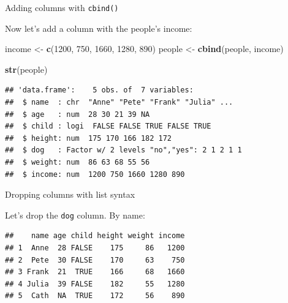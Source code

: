 \documentclass[ignorenonframetext,]{beamer}
\newenvironment{Shaded}{\begin{snugshade}}{\end{snugshade}}
\newcommand{\CommentTok}[1]{\textcolor[rgb]{0.56,0.35,0.01}{\textit{#1}}}
\newcommand{\DecValTok}[1]{\textcolor[rgb]{0.00,0.00,0.81}{#1}}
\newcommand{\KeywordTok}[1]{\textcolor[rgb]{0.13,0.29,0.53}{\textbf{#1}}}
\newcommand{\NormalTok}[1]{#1}
\newcommand{\OperatorTok}[1]{\textcolor[rgb]{0.81,0.36,0.00}{\textbf{#1}}}
\newcommand{\OtherTok}[1]{\textcolor[rgb]{0.56,0.35,0.01}{#1}}
\newcommand{\StringTok}[1]{\textcolor[rgb]{0.31,0.60,0.02}{#1}}
\begin{document}
\begin{frame}[fragile]{Adding columns with \texttt{cbind()}}
\protect\hypertarget{adding-columns-with-cbind}{}

Now let's add a column with the people's income:

\begin{Shaded}
\begin{Highlighting}[]
\NormalTok{income <-}\StringTok{ }\KeywordTok{c}\NormalTok{(}\DecValTok{1200}\NormalTok{, }\DecValTok{750}\NormalTok{, }\DecValTok{1660}\NormalTok{, }\DecValTok{1280}\NormalTok{, }\DecValTok{890}\NormalTok{) }
\NormalTok{people <-}\StringTok{ }\KeywordTok{cbind}\NormalTok{(people, income)}
 
 \KeywordTok{str}\NormalTok{(people)}
\end{Highlighting}
\end{Shaded}

\begin{verbatim}
## 'data.frame':    5 obs. of  7 variables:
##  $ name  : chr  "Anne" "Pete" "Frank" "Julia" ...
##  $ age   : num  28 30 21 39 NA
##  $ child : logi  FALSE FALSE TRUE FALSE TRUE
##  $ height: num  175 170 166 182 172
##  $ dog   : Factor w/ 2 levels "no","yes": 2 1 2 1 1
##  $ weight: num  86 63 68 55 56
##  $ income: num  1200 750 1660 1280 890
\end{verbatim}

\end{frame}

\begin{frame}[fragile]{Dropping columns with list syntax}
\protect\hypertarget{dropping-columns-with-list-syntax}{}

Let's drop the \texttt{dog} column. By name:

\begin{Shaded}
\end{Shaded}

\begin{verbatim}
##    name age child height weight income
## 1  Anne  28 FALSE    175     86   1200
## 2  Pete  30 FALSE    170     63    750
## 3 Frank  21  TRUE    166     68   1660
## 4 Julia  39 FALSE    182     55   1280
## 5  Cath  NA  TRUE    172     56    890
\end{verbatim}

\end{frame}
\end{document}
